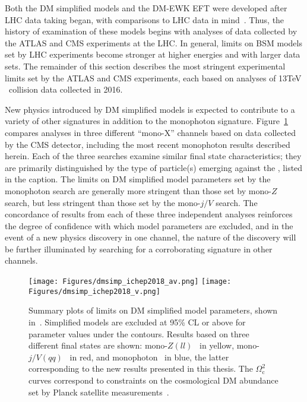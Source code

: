 Both the DM simplified models and the DM-EWK EFT were developed after LHC data taking began, with comparisons to LHC data in mind~\cite{ref:1507.00966, ref:PhysRevD.89.056011}.
Thus, the history of examination of these models begins with analyses of data collected by the ATLAS and CMS experiments at the LHC.
In general, limits on BSM models set by LHC experiments become stronger at higher energies and with larger data sets.
The remainder of this section describes the most stringent experimental limits set by the ATLAS and CMS experiments, each based on analyses of 13\unit{TeV} \Pp\Pp\ collision data
collected in 2016.

New physics introduced by DM simplified models is expected to contribute to a variety of other signatures in addition to the monophoton signature. Figure~\ref{fig:dmsimp_ichep2018} compares
analyses in three different ``mono-X'' channels based on data collected by the CMS detector, including the most recent monophoton results described herein. Each of the three
searches examine similar final state characteristics; they are primarily distinguished by the type of particle(s) emerging against the \vecMET, listed in the caption.
The limits on DM simplified model parameters set by the monophoton search are generally more stringent than those set by mono-$Z$ search, but less stringent
than those set by the mono-$j/V$ search. The concordance of results from each of these three independent analyses reinforces the degree of confidence with which model
parameters are excluded, and in the event of a new physics discovery in one channel, the nature of the discovery will be further illuminated by searching for a corroborating
signature in other channels.

\begin{figure}[hbtb]
  \begin{center}
    \texttt{[image: Figures/dmsimp\_ichep2018\_av.png]}
    \texttt{[image: Figures/dmsimp\_ichep2018\_v.png]}
    \caption{Summary plots of limits on DM simplified model parameters, shown in~\cite{ref:dmsummaryplots_ichep2018}. Simplified models are excluded at 95\% CL or above
    for parameter values under the contours.
    Results based on three different final states are shown: mono-$Z(ll)$~\cite{ref:epjc/s10052-018-5740-1} in yellow, mono-$j/V(qq)$~\cite{ref:PhysRevD.97.092005} in red, and monophoton~\cite{ref:1810.00196} in blue,
    the latter corresponding to the new results presented in this thesis. The $\Omega_\mathrm{c}^{2}$ curves correspond to constraints on the cosmological DM abundance set by Planck satellite measurements~\cite{ref:planck2018_cosparams}.}
    \label{fig:dmsimp_ichep2018}
  \end{center}
\end{figure}

